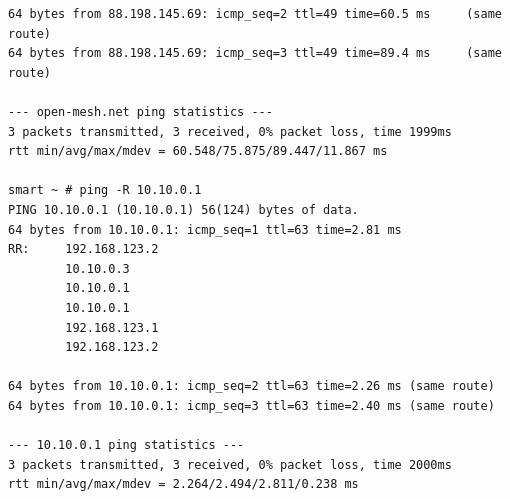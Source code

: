 \documentclass[11pt]{article}
\begin{document}
\begin{enumerate}
\begin{small}
\begin{verbatim}
64 bytes from 88.198.145.69: icmp_seq=2 ttl=49 time=60.5 ms     (same route)
64 bytes from 88.198.145.69: icmp_seq=3 ttl=49 time=89.4 ms     (same route)

--- open-mesh.net ping statistics ---
3 packets transmitted, 3 received, 0% packet loss, time 1999ms
rtt min/avg/max/mdev = 60.548/75.875/89.447/11.867 ms

smart ~ # ping -R 10.10.0.1
PING 10.10.0.1 (10.10.0.1) 56(124) bytes of data.
64 bytes from 10.10.0.1: icmp_seq=1 ttl=63 time=2.81 ms
RR:     192.168.123.2
        10.10.0.3
        10.10.0.1
        10.10.0.1
        192.168.123.1
        192.168.123.2

64 bytes from 10.10.0.1: icmp_seq=2 ttl=63 time=2.26 ms (same route)
64 bytes from 10.10.0.1: icmp_seq=3 ttl=63 time=2.40 ms (same route)

--- 10.10.0.1 ping statistics ---
3 packets transmitted, 3 received, 0% packet loss, time 2000ms
rtt min/avg/max/mdev = 2.264/2.494/2.811/0.238 ms
\end{verbatim} \end{small}



\end{enumerate}



%
%
%
%





\end{document}
